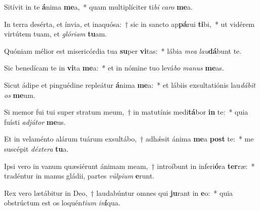 \item Sitívit in te \textbf{á}nima \textbf{me}a,~* quam multiplíciter ti\textit{bi} \textit{ca}\textit{ro} \textbf{me}a.
\item In terra desérta, et ínvia, et inaquósa:~† sic in sancto ap\textbf{pá}rui \textbf{ti}bi,~* ut vidérem virtútem tuam, et \textit{gló}\textit{ri}\textit{am} \textbf{tu}am.
\item Quóniam mélior est misericórdia tua \textbf{su}per \textbf{vi}tas:~* lábia \textit{me}\textit{a} \textit{lau}\textbf{dá}bunt te.
\item Sic benedícam te in \textbf{vi}ta \textbf{me}a:~* et in nómine tuo levá\textit{bo} \textit{ma}\textit{nus} \textbf{me}as.
\item Sicut ádipe et pinguédine repleátur \textbf{á}nima \textbf{me}a:~* et lábiis exsultatiónis lau\textit{dá}\textit{bit} \textit{os} \textbf{me}um.
\item Si memor fui tui super stratum meum,~† in matutínis medi\textbf{tá}bor \textbf{in} te:~* quia fuísti \textit{ad}\textit{jú}\textit{tor} \textbf{me}us.
\item Et in velaménto alárum tuárum exsultábo,~† adhǽsit ánima \textbf{me}a \textbf{post} te:~* me suscépit \textit{déx}\textit{te}\textit{ra} \textbf{tu}a.
\item Ipsi vero in vanum quæsiérunt ánimam meam,~† introíbunt in inferi\textbf{ó}ra \textbf{ter}ræ:~* tradéntur in manus gládii, partes \textit{vúl}\textit{pi}\textit{um} \textbf{e}runt.
\item Rex vero lætábitur in Deo,~† laudabúntur omnes qui \textbf{ju}rant in \textbf{e}o:~* quia obstrúctum est os loquén\textit{ti}\textit{um} \textit{in}\textbf{í}qua.
